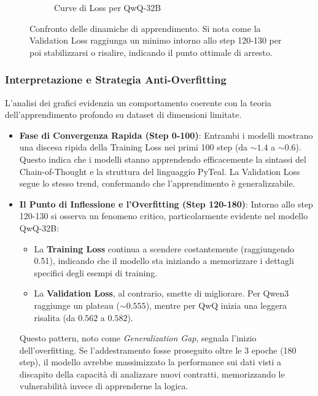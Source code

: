 \begin{figure}[ht]
\begin{subfigure}[b]{0.48\textwidth}
        \caption{Curve di Loss per QwQ-32B}
    \end{subfigure}
    \caption{Confronto delle dinamiche di apprendimento. Si nota come la Validation Loss raggiunga un minimo intorno allo step 120-130 per poi stabilizzarsi o risalire, indicando il punto ottimale di arresto.}
    \label{fig:loss_curves}
\end{figure}

\subsubsection{Interpretazione e Strategia Anti-Overfitting}
L'analisi dei grafici evidenzia un comportamento coerente con la teoria dell'apprendimento profondo su dataset di dimensioni limitate. 
\begin{itemize}
    \item \textbf{Fase di Convergenza Rapida (Step 0-100)}: Entrambi i modelli mostrano una discesa ripida della Training Loss nei primi 100 step (da $\sim1.4$ a $\sim0.6$). Questo indica che i modelli stanno apprendendo efficacemente la sintassi del Chain-of-Thought e la struttura del linguaggio PyTeal. La Validation Loss segue lo stesso trend, confermando che l'apprendimento è generalizzabile.
    \item \textbf{Il Punto di Inflessione e l'Overfitting (Step 120-180)}: Intorno allo step 120-130 si osserva un fenomeno critico, particolarmente evidente nel modello QwQ-32B:
\begin{itemize}
    \item La \textbf{Training Loss} continua a scendere costantemente (raggiungendo 0.51), indicando che il modello sta iniziando a memorizzare i dettagli specifici degli esempi di training.
    \item La \textbf{Validation Loss}, al contrario, smette di migliorare. Per Qwen3 raggiunge un plateau ($\sim0.555$), mentre per QwQ inizia una leggera risalita (da $0.562$ a $0.582$).
\end{itemize}

Questo pattern, noto come \textit{Generalization Gap}, segnala l'inizio dell'overfitting. Se l'addestramento fosse proseguito oltre le 3 epoche (180 step), il modello avrebbe massimizzato la performance sui dati visti a discapito della capacità di analizzare nuovi contratti, memorizzando le vulnerabilità invece di apprenderne la logica.
\end{itemize}

